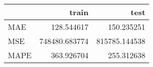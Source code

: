 \begin{tabular}{lrr}
\toprule
{} &          train &           test \\
\midrule
MAE  &     128.544617 &     150.235251 \\
MSE  &  748480.683774 &  815785.144538 \\
MAPE &     363.926704 &     255.312638 \\
\bottomrule
\end{tabular}
